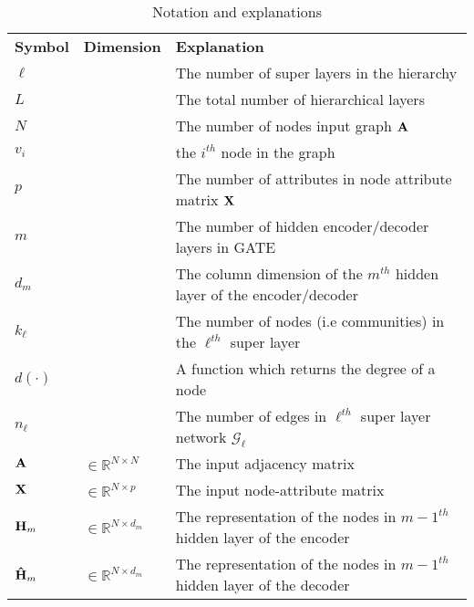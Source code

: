\documentclass[a4paper,12pt]{article}
\begin{document}
	

\newpage
\appendix
\begin{table}[!ht]
	\centering
	\caption{Notation and explanations}
	\begin{tabular}{p{2cm}|p{3cm}|p{10cm}}
		\toprule[0.08cm]
		\bf Symbol & \centering \bf Dimension & \bf Explanation \\
		\cmidrule(lr){1-3}
		$\ell$ & & The number of super layers in the hierarchy \\
		
		$L$ & & The total number of hierarchical layers  \\
		
		$N$ & & The number of nodes input graph ${\bf A}$ \\
		
		$v_i$ & & the $i^{th}$ node in the graph \\
		
		$p$ & & The number of attributes in node attribute matrix $\bf X$ \\
		
		$m$ & & The number of hidden encoder/decoder layers in GATE \\
		
		$d_m$ & & The column dimension of the $m^{th}$ hidden layer of the encoder/decoder \\
		
		$k_\ell$ & & The number of nodes (i.e communities) in the $\ell^{th}$ super layer \\
		
		$d(\cdot)$ & & A function which returns the degree of a node \\
		
		$n_\ell$ & & The number of edges in $\ell^{th}$ super layer network $\mathcal{G}_{\ell}$ \\
		
		${\bf A}$ & $ \in \mathbb{R}^{N \times N}$ & The input adjacency matrix \\
		
		${\bf X}$ &$\in \mathbb{R}^{N \times p}$ & The input node-attribute matrix \\
		
		${\bf H}_{m}$ & $\in \mathbb{R}^{N \times d_{m}}$ & The representation of the nodes in ${m-1}^{th}$ hidden layer of the encoder\\
		
		${\bf \hat{H}}_{m}$ & $\in \mathbb{R}^{N \times d_{m}}$ & The representation of the nodes in ${m-1}^{th}$ hidden layer of the decoder\\
		

\end{tabular}
\end{table}
\end{document}
